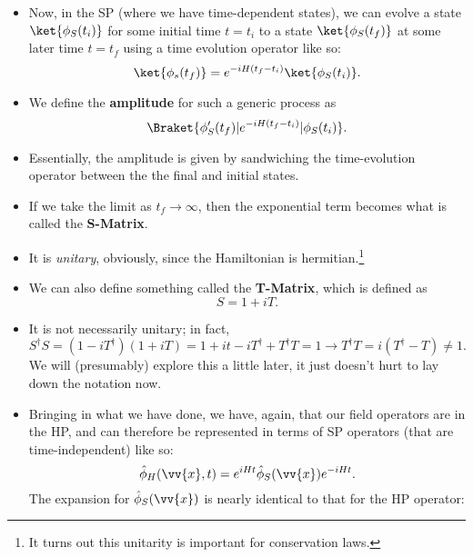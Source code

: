 \begin{itemize}
    \item Now, in the SP (where we have time-dependent states), we can evolve a state $\ket{\phi_S(t_i)}$ for some initial time $t=t_i$ to a state $\ket{\phi_S(t_f)}$ at some later time $t=t_f$ using a time evolution operator like so:
        \begin{equation*}
            \ket{\phi_s(t_f)} = e^{-iH(t_f-t_i)} \ket{\phi_S(t_i)}.
        \end{equation*}
    \item We define the \textbf{amplitude} for such a generic process as
        \begin{equation}
            \Braket{\phi_S'(t_f) | e^{-iH(t_f-t_i)} | \phi_S(t_i)}.
        \end{equation}
    \item Essentially, the amplitude is given by sandwiching the time-evolution operator between the the final and initial states.
    \item If we take the limit as $t_f \rightarrow \infty$, then the exponential term becomes what is called the \textbf{S-Matrix}.
    \item It is \textit{unitary}, obviously, since the Hamiltonian is hermitian.\footnote{It turns out this unitarity is important for conservation laws.}
    \item We can also define something called the \textbf{T-Matrix}, which is defined as
        \begin{equation}
            S = 1 + iT.
        \end{equation}
    \item It is not necessarily unitary; in fact,
        \begin{equation*}
            S^{\dagger}S = (1-iT^{\dagger})(1+iT) = 1+it-iT^{\dagger} + T^{\dagger}T = 1 \rightarrow T^{\dagger}T = i(T^{\dagger} - T) \neq 1.
        \end{equation*}
        We will (presumably) explore this a little later, it just doesn't hurt to lay down the notation now.
    \item Bringing in what we have done, we have, again, that our field operators are in the HP, and can therefore be represented in terms of SP operators (that are time-independent) like so:
        \begin{equation*}
            \hat{\phi}_H(\vv{x},t) = e^{iHt} \hat{\phi}_S(\vv{x}) e^{-iHt}.
        \end{equation*}
        The expansion for $\hat{\phi}_S(\vv{x})$ is nearly identical to that for the HP operator:

\end{itemize}
